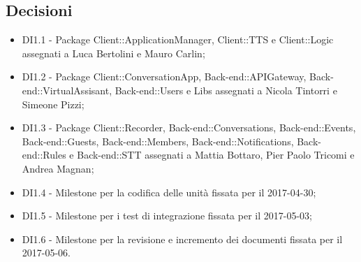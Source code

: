 \documentclass[a4paper,titlepage]{article}
\begin{document}
 \subsection{Decisioni}
 \begin{itemize}
  \item DI1.1 - Package Client::ApplicationManager, Client::TTS e Client::Logic assegnati a Luca Bertolini e Mauro Carlin;
  \item DI1.2 - Package Client::ConversationApp, Back-end::APIGateway, Back-end::VirtualAssisant, Back-end::Users e Libs assegnati a Nicola Tintorri e Simeone Pizzi;
  \item DI1.3 - Package Client::Recorder, Back-end::Conversations, Back-end::Events, Back-end::Guests, Back-end::Members, Back-end::Notifications, Back-end::Rules e Back-end::STT assegnati a Mattia Bottaro, Pier Paolo Tricomi e Andrea Magnan;
  \item DI1.4 - Milestone per la codifica delle unità fissata per il 2017-04-30;
  \item DI1.5 - Milestone per i test di integrazione fissata per il 2017-05-03;
  \item DI1.6 - Milestone per la revisione e incremento dei documenti fissata per il 2017-05-06.
 \end{itemize}
\end{document}
